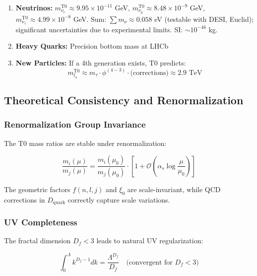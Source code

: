 	\begin{enumerate}
		\item \textbf{Neutrinos:} $m_{\nu_e}^{\text{T0}} \approx 9.95 \times 10^{-11}$ GeV, $m_{\nu_\mu}^{\text{T0}} \approx 8.48 \times 10^{-9}$ GeV, $m_{\nu_\tau}^{\text{T0}} \approx 4.99 \times 10^{-8}$ GeV. Sum: $\sum m_\nu \approx 0.058$ eV (testable with DESI, Euclid); significant uncertainties due to experimental limits. SI: $\sim 10^{-46}$ kg.
		
		\item \textbf{Heavy Quarks:} Precision bottom mass at LHCb
		
		\item \textbf{New Particles:} If a 4th generation exists, T0 predicts:
		\begin{equation}
			m_{l_4}^{\text{T0}} \approx m_\tau \cdot \phi^{(4-3)} \cdot \text{(corrections)} \approx 2.9 \text{ TeV}
		\end{equation}
	\end{enumerate}
	
	\subsection{Theoretical Consistency and Renormalization}
	
	\subsubsection{Renormalization Group Invariance}
	
	The T0 mass ratios are stable under renormalization:
	
	\begin{equation}
		\frac{m_i(\mu)}{m_j(\mu)} = \frac{m_i(\mu_0)}{m_j(\mu_0)} \cdot \left[1 + \mathcal{O}\left(\alpha_s \log\frac{\mu}{\mu_0}\right)\right]
	\end{equation}
	
	The geometric factors $f(n,l,j)$ and $\xi_0$ are scale-invariant, while QCD corrections in $D_{\text{quark}}$ correctly capture scale variations.
	
	\subsubsection{UV Completeness}
	
	The fractal dimension $D_f < 3$ leads to natural UV regularization:
	
	\begin{equation}
		\int_0^\Lambda k^{D_f-1} dk = \frac{\Lambda^{D_f}}{D_f} \quad \text{(convergent for } D_f < 3\text{)}
	\end{equation}
	

